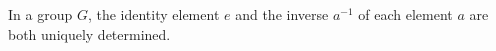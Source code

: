 In a group $G$, the identity element $e$ and the inverse $a^{-1}$ of each element $a$ are both uniquely determined.
